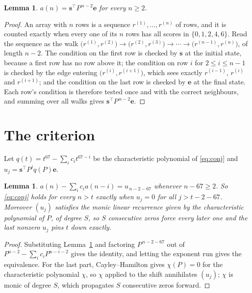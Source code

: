 \documentclass[11pt,a4paper]{article}
\theoremstyle{plain}
\newtheorem{lemma}[theorem]{Lemma}
\theoremstyle{definition}
\begin{document}
\begin{lemma}\label{lem:walk}
$a(n)=\mathbf{s}^{\!\top}P^{\,n-2}\mathbf{e}$ for every $n\ge2$.
\end{lemma}

\begin{proof}
An array with $n$ rows is a sequence $r^{(1)},\dots,r^{(n)}$ of rows, and it is counted
exactly when every one of its $n$ rows has all scores in $\{0,1,2,4,6\}$. Read the sequence as the
walk $\bigl(r^{(1)},r^{(2)}\bigr)\to\bigl(r^{(2)},r^{(3)}\bigr)\to\cdots\to
\bigl(r^{(n-1)},r^{(n)}\bigr)$, of length $n-2$. The condition on the first row is
checked by $\mathbf{s}$ at the initial state, because a first row has no row above it; the
condition on row $i$ for $2\le i\le n-1$ is checked by the edge entering
$\bigl(r^{(i)},r^{(i+1)}\bigr)$, which sees exactly $r^{(i-1)}$, $r^{(i)}$ and
$r^{(i+1)}$; and the condition on the last row is checked by $\mathbf{e}$ at the final
state. Each row's condition is therefore tested once and with the correct neighbours, and
summing over all walks gives $\mathbf{s}^{\!\top}P^{\,n-2}\mathbf{e}$.
\end{proof}

\section{The criterion}

Let $q(t)=t^{67}-\sum_i c_i t^{67-i}$ be the characteristic polynomial of
\eqref{eq:conj} and $u_j=\mathbf{s}^{\!\top}P^{j}q(P)\mathbf{e}$.

\begin{lemma}\label{lem:crit}
$a(n)-\sum_i c_i a(n-i)=u_{\,n-2-67}$ whenever $n-67\ge2$. So \eqref{eq:conj}
holds for every $n>t$ exactly when $u_j=0$ for all $j>t-2-67$. Moreover $(u_j)$
satisfies the monic linear recurrence given by the characteristic polynomial of $P$, of
degree $S$, so $S$ consecutive zeros force every later one and the last nonzero $u_j$ pins
$t$ down exactly.
\end{lemma}

\begin{proof}
Substituting Lemma~\ref{lem:walk} and factoring $P^{\,n-2-67}$ out of
$P^{n-2}-\sum_i c_i P^{n-i-2}$ gives the identity, and letting the exponent run gives the
equivalence. For the last part, Cayley--Hamilton gives $\chi(P)=0$ for the characteristic
polynomial $\chi$, so $\chi$ applied to the shift annihilates $(u_j)$; $\chi$ is monic of
degree $S$, which propagates $S$ consecutive zeros forward.
\end{proof}
\end{document}

